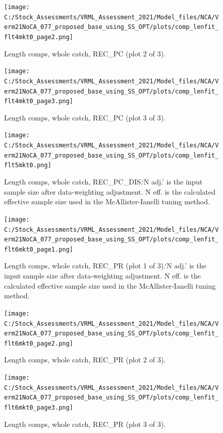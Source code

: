 \documentclass[
  english,
  a4paper,
]{article}
\begin{document}
\begin{figure}
\centering
\texttt{[image: C:/Stock\_Assessments/VRML\_Assessment\_2021/Model\_files/NCA/Verm21NoCA\_077\_proposed\_base\_using\_SS\_OPT/plots/comp\_lenfit\_flt4mkt0\_page2.png]}
\caption{Length comps, whole catch, REC\_PC (plot 2 of 3).\label{fig:comp_lenfit_flt4mkt0_page2}}
\end{figure}

\begin{figure}
\centering
\texttt{[image: C:/Stock\_Assessments/VRML\_Assessment\_2021/Model\_files/NCA/Verm21NoCA\_077\_proposed\_base\_using\_SS\_OPT/plots/comp\_lenfit\_flt4mkt0\_page3.png]}
\caption{Length comps, whole catch, REC\_PC (plot 3 of 3).\label{fig:comp_lenfit_flt4mkt0_page3}}
\end{figure}

\begin{figure}
\centering
\texttt{[image: C:/Stock\_Assessments/VRML\_Assessment\_2021/Model\_files/NCA/Verm21NoCA\_077\_proposed\_base\_using\_SS\_OPT/plots/comp\_lenfit\_flt5mkt0.png]}
\caption{Length comps, whole catch, REC\_PC\_DIS.`N adj.' is the input sample size after data-weighting adjustment. N eff. is the calculated effective sample size used in the McAllister-Ianelli tuning method.\label{fig:comp_lenfit_flt5mkt0}}
\end{figure}

\begin{figure}
\centering
\texttt{[image: C:/Stock\_Assessments/VRML\_Assessment\_2021/Model\_files/NCA/Verm21NoCA\_077\_proposed\_base\_using\_SS\_OPT/plots/comp\_lenfit\_flt6mkt0\_page1.png]}
\caption{Length comps, whole catch, REC\_PR (plot 1 of 3).`N adj.' is the input sample size after data-weighting adjustment. N eff. is the calculated effective sample size used in the McAllister-Ianelli tuning method.\label{fig:comp_lenfit_flt6mkt0_page1}}
\end{figure}

\begin{figure}
\centering
\texttt{[image: C:/Stock\_Assessments/VRML\_Assessment\_2021/Model\_files/NCA/Verm21NoCA\_077\_proposed\_base\_using\_SS\_OPT/plots/comp\_lenfit\_flt6mkt0\_page2.png]}
\caption{Length comps, whole catch, REC\_PR (plot 2 of 3).\label{fig:comp_lenfit_flt6mkt0_page2}}
\end{figure}

\begin{figure}
\centering
\texttt{[image: C:/Stock\_Assessments/VRML\_Assessment\_2021/Model\_files/NCA/Verm21NoCA\_077\_proposed\_base\_using\_SS\_OPT/plots/comp\_lenfit\_flt6mkt0\_page3.png]}
\caption{Length comps, whole catch, REC\_PR (plot 3 of 3).\label{fig:comp_lenfit_flt6mkt0_page3}}
\end{figure}
\end{document}
